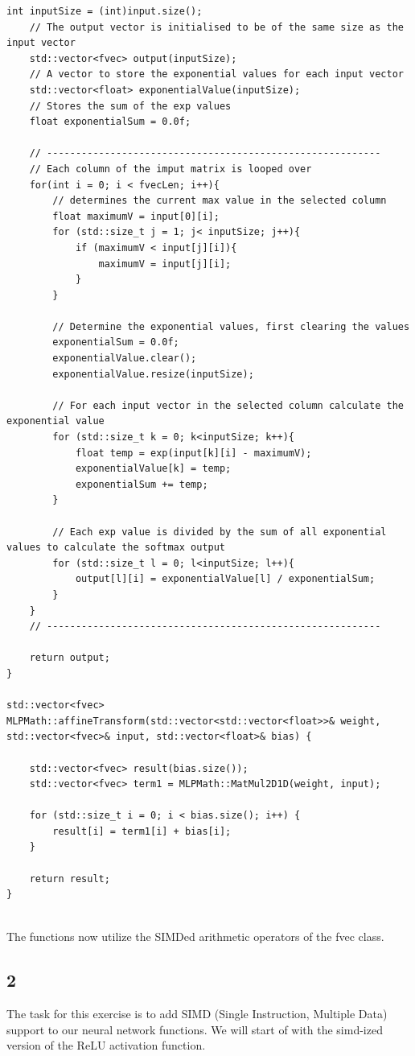 \documentclass{article}
\begin{document}
\begin{lstlisting}[caption=SIMDed math functions]
    int inputSize = (int)input.size();
    // The output vector is initialised to be of the same size as the input vector
    std::vector<fvec> output(inputSize);
    // A vector to store the exponential values for each input vector
    std::vector<float> exponentialValue(inputSize);
    // Stores the sum of the exp values
    float exponentialSum = 0.0f;

    // ----------------------------------------------------------
    // Each column of the imput matrix is looped over
    for(int i = 0; i < fvecLen; i++){
        // determines the current max value in the selected column
        float maximumV = input[0][i];
        for (std::size_t j = 1; j< inputSize; j++){
            if (maximumV < input[j][i]){
                maximumV = input[j][i];
            }
        }

        // Determine the exponential values, first clearing the values
        exponentialSum = 0.0f;
        exponentialValue.clear();
        exponentialValue.resize(inputSize);

        // For each input vector in the selected column calculate the exponential value
        for (std::size_t k = 0; k<inputSize; k++){
            float temp = exp(input[k][i] - maximumV);
            exponentialValue[k] = temp;
            exponentialSum += temp;
        }

        // Each exp value is divided by the sum of all exponential values to calculate the softmax output
        for (std::size_t l = 0; l<inputSize; l++){
            output[l][i] = exponentialValue[l] / exponentialSum;
        }
    }
    // ----------------------------------------------------------
    
    return output;
}

std::vector<fvec> MLPMath::affineTransform(std::vector<std::vector<float>>& weight, std::vector<fvec>& input, std::vector<float>& bias) {

    std::vector<fvec> result(bias.size());
    std::vector<fvec> term1 = MLPMath::MatMul2D1D(weight, input);

    for (std::size_t i = 0; i < bias.size(); i++) {
        result[i] = term1[i] + bias[i];
    }

    return result;
}
    
\end{lstlisting}
The functions now utilize the SIMDed arithmetic operators of the fvec class. \\
\subsection*{2}
The task for this exercise is to add SIMD (Single Instruction, Multiple Data) support to our neural network functions.
We will start of with the simd-ized version of the ReLU activation function. \\
\end{document}
